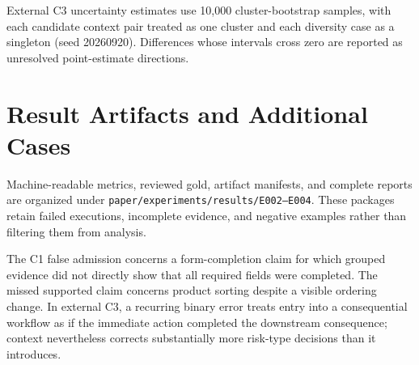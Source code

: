 External C3 uncertainty estimates use 10,000 cluster-bootstrap samples, with
each candidate context pair treated as one cluster and each diversity case as a
singleton (seed 20260920). Differences whose intervals cross zero are reported
as unresolved point-estimate directions.

\section{Result Artifacts and Additional Cases}

Machine-readable metrics, reviewed gold, artifact manifests, and complete
reports are organized under \texttt{paper/experiments/results/E002--E004}.
These packages retain failed executions, incomplete evidence, and negative
examples rather than filtering them from analysis.

The C1 false admission concerns a form-completion claim for which grouped
evidence did not directly show that all required fields were completed. The
missed supported claim concerns product sorting despite a visible ordering
change. In external C3, a recurring binary error treats entry into a
consequential workflow as if the immediate action completed the downstream
consequence; context nevertheless corrects substantially more risk-type
decisions than it introduces.
